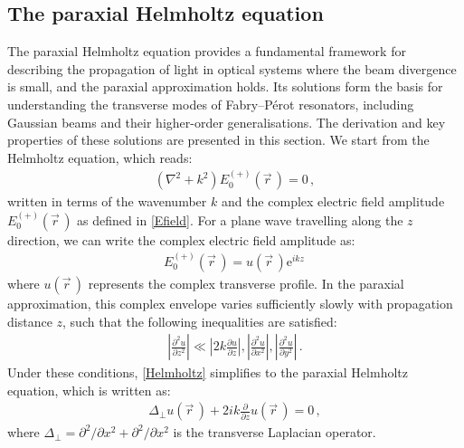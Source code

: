 \documentclass[../Thesis-IJspeert.tex]{subfiles}
\begin{document}
\subsection{The paraxial Helmholtz equation}
The paraxial Helmholtz equation provides a fundamental framework for describing the propagation of light in optical systems where the beam divergence is small, and the paraxial approximation holds. Its solutions form the basis for understanding the transverse modes of Fabry--Pérot resonators, including Gaussian beams and their higher-order generalisations. The derivation and key properties of these solutions are presented in this section. We start from the Helmholtz equation, which reads:
\begin{align}
	\label{Helmholtz}
	\left(\nabla^2 + k^2\right) E_0^{(+)}(\vec{r}\,)=0\,,
\end{align}
written in terms of the wavenumber $k$ and the complex electric field amplitude $E_0^{(+)}(\vec{r}\,)$ as defined in \autoref{Efield}. For a plane wave travelling along the $z$ direction, we can write the complex electric field amplitude as:
\begin{align}
	E_0^{(+)}(\vec{r}\,)=u(\vec{r}\,)\mathrm{e}^{ikz}\,
\end{align}
where $u(\vec{r}\,)$ represents the complex transverse profile. In the paraxial approximation, this complex envelope varies sufficiently slowly with propagation distance $z$, such that the following inequalities are satisfied:
\begin{align}
	\left\lvert \frac{\partial^2 u}{\partial z^2} \right\rvert \ll  \left\lvert 2k \frac{\partial u}{\partial z}\right\rvert , \left\lvert \frac{\partial^2 u}{\partial x^2} \right\rvert, \left\lvert \frac{\partial^2 u}{\partial y^2} \right\rvert \,.
\end{align}
Under these conditions, \autoref{Helmholtz} simplifies to the paraxial Helmholtz equation, which is written as:
\begin{align}
	\label{paraxialHelmholtz}
	\Delta_\perp u(\vec{r}\,)+2ik\frac{\partial}{\partial z}u(\vec{r}\,)=0\,,
\end{align}
where $\Delta_\perp={\partial^2}/{\partial x^2} + {\partial^2}/{\partial x^2}$ is the transverse Laplacian operator.
\end{document}
